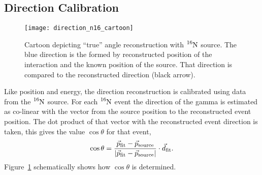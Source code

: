 \subsection{Direction Calibration}
\begin{figure}[htbp]
    \centering
    \texttt{[image: direction\_n16\_cartoon]}
    \caption[Cartoon of Direction Reconstruction With $\ce{^{16}N}$]{
        Cartoon depicting ``true'' angle reconstruction with $\ce{^{16}N}$
    source. The blue direction is the formed by reconstructed position
of the interaction and the known position of the source. That direction
    is compared to the reconstructed direction (black arrow).}
    \label{fig:n16_direction_cartoon}
\end{figure}
Like position and energy, the direction reconstruction is calibrated using data
from the $\ce{^{16}N}$ source. For each $\ce{^{16}N}$ event the direction
of the gamma is estimated as co-linear with the vector from the source
position to the reconstructed event position. The dot product of that vector
with the reconstructed event direction is taken, this gives the value $\cos\theta$
for that event,
\begin{equation}
    \cos\theta = \frac{\vec{p}_{\mathrm{fit}} - \vec{p}_{\mathrm{source}}}
                {\abs{\vec{p}_{\mathrm{fit}} - \vec{p}_{\mathrm{source}}}} \cdot \vec{d}_{\mathrm{fit}}\text{.}
\end{equation}
Figure~\ref{fig:n16_direction_cartoon} schematically shows how $\cos\theta$ is
determined.

